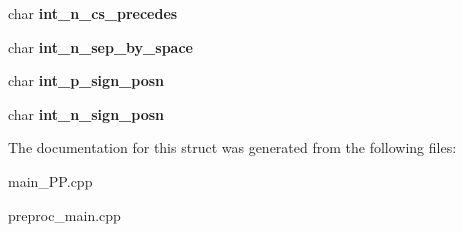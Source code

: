 \begin{DoxyCompactItemize}
\item 
\hypertarget{structlconv_a36121c68c5571e40145365dd1edecbb7}{char {\bfseries int\+\_\+n\+\_\+cs\+\_\+precedes}}\label{structlconv_a36121c68c5571e40145365dd1edecbb7}

\item 
\hypertarget{structlconv_ad9cfa63e25f4a2aa02f6c7ca540177a2}{char {\bfseries int\+\_\+n\+\_\+sep\+\_\+by\+\_\+space}}\label{structlconv_ad9cfa63e25f4a2aa02f6c7ca540177a2}

\item 
\hypertarget{structlconv_a266ed42f4bb087d1efac551940c42f6f}{char {\bfseries int\+\_\+p\+\_\+sign\+\_\+posn}}\label{structlconv_a266ed42f4bb087d1efac551940c42f6f}

\item 
\hypertarget{structlconv_a642a9096f724fad40fe9f1711e92b323}{char {\bfseries int\+\_\+n\+\_\+sign\+\_\+posn}}\label{structlconv_a642a9096f724fad40fe9f1711e92b323}

\end{DoxyCompactItemize}


The documentation for this struct was generated from the following files\+:\begin{DoxyCompactItemize}
\item 
main\+\_\+\+P\+P.\+cpp\item 
preproc\+\_\+main.\+cpp\end{DoxyCompactItemize}
